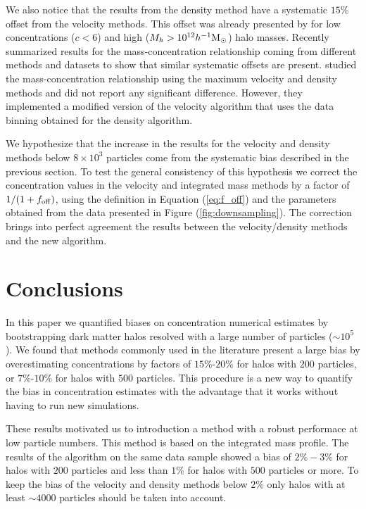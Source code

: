 \documentclass{emulateapj}
\newcommand{\hMsun}{{\ifmmode{h^{-1}{\rm {M_{\odot}}}}\else{$h^{-1}{\rm{M_{\odot}}}$}\fi}}
\begin{document}
We also notice that the results from the density method have a
systematic $15\%$offset from the velocity methods.  
This offset was already presented by \cite{Prada2012} for low
concentrations ($c<6$) and high ($M_h>10^{12}\hMsun$) halo masses.  
Recently \citep{Klypin2016} summarized results for the
mass-concentration relationship coming from different methods and
datasets to show that similar systematic offsets are present.
\citep{2014MNRAS.441.3359D} studied the mass-concentration
relationship using the maximum velocity and density methods and did
not report any significant difference. 
However, they implemented a modified version of the velocity algorithm
that uses the data binning obtained for the density algorithm.  


We hypothesize that the increase in the results for the velocity
and density methods below $8\times 10^{3}$ particles come from the
systematic bias described in the previous section.  
To test the general consistency of this hypothesis we correct the
concentration values in the velocity and integrated mass methods by a
factor of $1/(1+f_{\rm  off})$, using the definition in Equation
(\ref{eq:f_off}) and the  
parameters obtained from the data presented in Figure
(\ref{fig:downsampling}).  
The correction brings into perfect agreement the results between the
velocity/density methods and the new algorithm.

\section{Conclusions}
\label{sec:conclusions}

In this paper we quantified biases on concentration numerical estimates by
bootstrapping dark matter halos resolved with a  large number of
particles ($\sim 10^5$).
We found that methods commonly used in the literature present a large
bias by overestimating concentrations by factors of $15\%$-$20\%$ for
halos with $200$ particles, or $7\%$-$10\%$ for halos with $500$
particles.  
This procedure is a new way to quantify the bias in concentration
estimates with the advantage that it works without having to run new
simulations. 

These results motivated us to introduction a method with a robust
performace at low particle numbers.
This method is based on the integrated mass profile. 
The results of the algorithm on the same data sample showed a bias  of
$2\%-3\%$ for halos with $200$ particles and less than $1\%$ for halos
with $500$ particles or more.  
To keep the bias of the velocity and density methods below $2\%$ only halos
with at least $\sim 4000$ particles should be taken into account.
\end{document}

